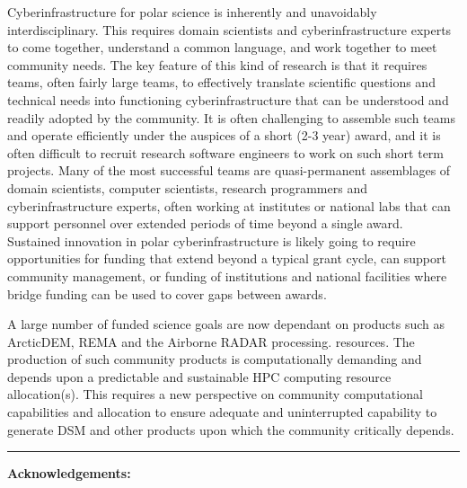 \documentclass[10pt,letterpaper,draft]{article}
\begin{document}
\begin{description}[style=unboxed]
\item[4.Sustained Investment in Collaboration:]
Cyberinfrastructure for polar science is inherently and unavoidably interdisciplinary. This requires domain scientists and cyberinfrastructure experts to come together, understand a common language, and work together to meet community needs. The key feature of this kind of research is that it requires teams, often fairly large teams, to effectively translate scientific questions and technical needs into functioning cyberinfrastructure that can be understood and readily adopted by the community. It is often challenging to assemble such teams and operate efficiently under the auspices of a short (2-3 year) award, and it is often difficult to recruit research software engineers to work on such short term projects. Many of the most successful teams are quasi-permanent assemblages of domain scientists, computer scientists, research programmers and cyberinfrastructure experts, often working at institutes or national labs that can support personnel over extended periods of time beyond a single award. Sustained innovation in polar cyberinfrastructure is likely going to require opportunities for funding that extend beyond a typical grant cycle, can support community management, or funding of institutions and national facilities where bridge funding can be used to cover gaps between awards. 

\item[ 5. Predictable and Sustainable Computing Allocation]
A large number of funded science goals are now dependant on products such as ArcticDEM, REMA and the Airborne RADAR processing.  resources.   The production of such community products is computationally demanding and depends upon a predictable and sustainable HPC computing resource allocation(s). This requires a new perspective on community computational capabilities and allocation to ensure adequate and uninterrupted capability to generate DSM and other products upon which the community critically depends. 

\end{description}



\hspace{1.5cm}\rule{13.0cm}{0.8pt}

\vspace{0.5cm}

{\noindent \bf \small Acknowledgements:}  
\end{document}
